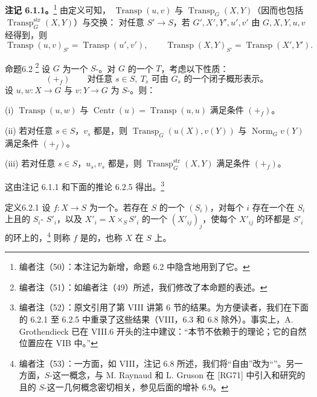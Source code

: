 \textbf{注记 6.1.1。}\footnote{编者注（50）：本注记为新增，命题 6.2 中隐含地用到了它。}
由定义可知， $\operatorname{Transp}(u,v)$ 与 $\operatorname{Transp}_G(X,Y)$（因而也包括 $\operatorname{Transp}^{\mathrm{str}}_G(X,Y)$）与交换：
对任意 $S'\to S$，若 $G',X',Y',u',v'$ 由 $G,X,Y,u,v$ 经得到，则
\[
\operatorname{Transp}(u,v)_{S'}=\operatorname{Transp}(u',v'),
\qquad \operatorname{Transp}(X,Y)_{S'}=\operatorname{Transp}(X',Y').
\]

\begin{SGAresult}{命题}{6.2}
\footnote{编者注（51）：如编者注（49）所述，我们修改了本命题的表述。}
设 $G$ 为一个 $S$-。对 $G$ 的一个 $T$，考虑以下性质：
\[
(+_f)\qquad \text{对任意 }s\in S,\ T_s\text{ 可由 }G_s\text{ 的一个闭子概形表示。}
\]
设 $u,w:X\to G$ 与 $v:Y\to G$ 为 $S$-。则：

(i) $\operatorname{Transp}(u,w)$ 与 $\operatorname{Centr}(u)=\operatorname{Transp}(u,u)$ 满足条件 $(+_f)$。

(ii) 若对任意 $s\in S$，$v_s$ 都是，则 $\operatorname{Transp}_G(u(X),v(Y))$ 与 $\operatorname{Norm}_G v(Y)$ 满足条件 $(+_f)$。

(iii) 若对任意 $s\in S$，$u_s,v_s$ 都是，则 $\operatorname{Transp}^{\mathrm{str}}_G(X,Y)$ 满足条件 $(+_f)$。
\end{SGAresult}
这由注记 6.1.1 和下面的推论 6.2.5 得出。\footnote{编者注（52）：原文引用了第 VIII 讲第 6 节的结果。为方便读者，我们在下面的 6.2.1 至 6.2.5 中重录了这些结果（VIII，6.3 和 6.8 除外）。事实上，A. Grothendieck 已在 VIII.6 开头的注中建议：“本节不依赖于的理论；它的自然位置应在 VIB 中。”}

\begin{SGAresult}{定义}{6.2.1}
设 $f:X\to S$ 为一个。若存在 $S$ 的一个 $(S_i)$，对每个 $i$ 存在一个在 $S_i$ 上且的 $S_i$- $S'_i$，以及 $X'_i=X\times_S S'_i$ 的一个 $(X'_{ij})_j$，使每个 $X'_{ij}$ 的环都是 $S'_i$ 的环上的，\footnote{编者注（53）：一方面，如 VIII，注记 6.8 所述，我们将“自由”改为“”。另一方面，$S$-这一概念，与 M. Raynaud 和 L. Gruson 在 [RG71] 中引入和研究的且的 $S$-这一几何概念密切相关，参见后面的增补 6.9。}
则称 $f$ 是的，也称 $X$ 在 $S$ 上。
\end{SGAresult}

